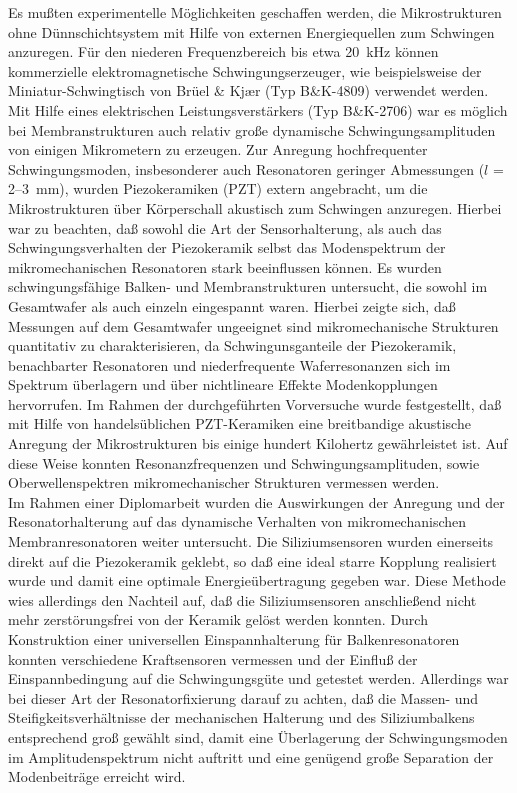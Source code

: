 Es mußten experimentelle Möglichkeiten geschaffen werden, die
Mikrostrukturen ohne Dünnschichtsystem mit Hilfe von externen
Energiequellen zum Schwingen anzuregen. Für den niederen Frequenzbereich
bis etwa 20~kHz können kommerzielle elektromagnetische Schwingungserzeuger,
wie beispielsweise der Miniatur-Schwingtisch von Brüel \& Kj\ae r
(Typ B\&K-4809) verwendet werden. Mit Hilfe eines elektrischen
Leistungsverstärkers (Typ B\&K-2706) war es möglich bei
Membranstrukturen auch relativ große dynamische Schwingungsamplituden
von einigen Mikrometern zu erzeugen. Zur Anregung hochfrequenter
Schwingungsmoden, insbesonderer auch Resonatoren geringer Abmessungen
($l$ = 2--3~mm), wurden Piezokeramiken (PZT) extern angebracht, um die
Mikrostrukturen über
Körperschall akustisch zum Schwingen anzuregen. Hierbei war zu beachten,
daß sowohl die Art der Sensorhalterung, als auch das Schwingungsverhalten
der Piezokeramik selbst das Modenspektrum der mikromechanischen Resonatoren
stark beeinflussen können. Es wurden schwingungsfähige Balken- und
Membranstrukturen untersucht, die sowohl im Gesamtwafer als auch einzeln
eingespannt waren. Hierbei zeigte sich, daß Messungen
auf dem Gesamtwafer ungeeignet sind mikromechanische Strukturen quantitativ
zu charakterisieren, da Schwingunsganteile der Piezokeramik, benachbarter
Resonatoren und niederfrequente Waferresonanzen sich im Spektrum überlagern
und über nichtlineare Effekte Modenkopplungen hervorrufen. Im Rahmen der
durchgeführten Vorversuche wurde festgestellt, daß mit Hilfe von
handelsüblichen PZT-Keramiken eine breitbandige akustische Anregung der
Mikrostrukturen bis einige hundert Kilohertz gewährleistet ist. Auf diese
Weise konnten Resonanzfrequenzen und Schwingungsamplituden, sowie
Oberwellenspektren mikromechanischer Strukturen vermessen werden.\\
%
Im Rahmen einer Diplomarbeit \cite{Bra92a} wurden die Auswirkungen der
Anregung und der Resonatorhalterung auf das dynamische Verhalten
von mikromechanischen Membranresonatoren weiter untersucht.
Die Siliziumsensoren wurden einerseits direkt auf die Piezokeramik geklebt,
so daß eine ideal starre Kopplung realisiert wurde und damit eine optimale
Energieüber\-tragung gegeben war. Diese Methode wies allerdings den
Nachteil auf, daß die Siliziumsensoren
anschließend nicht mehr zerstörungsfrei von der Keramik gelöst werden
konnten. Durch Konstruktion einer universellen Einspannhalterung für
Balkenresonatoren \cite{Bra92b} konnten verschiedene Kraftsensoren
vermessen und der Einfluß der Einspannbedingung auf die Schwingungsgüte
und getestet werden. Allerdings war bei dieser Art der
Resonatorfixierung darauf zu achten, daß die Massen- und
Steifigkeitsverhältnisse der mechanischen Halterung und des
Siliziumbalkens entsprechend groß gewählt sind, damit eine Überlagerung
der Schwingungsmoden im Amplitudenspektrum nicht auftritt und eine genügend
große Separation der Modenbeiträge erreicht wird.\\


